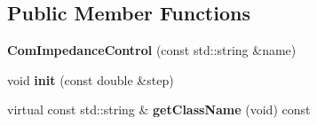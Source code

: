 \subsection*{Public Member Functions}
\begin{DoxyCompactItemize}
\item 
{\bfseries Com\+Impedance\+Control} (const std\+::string \&name)\hypertarget{classdynamicgraph_1_1sot_1_1ComImpedanceControl_a1da4aa67c57a44b99f7923053af4bda4}{}\label{classdynamicgraph_1_1sot_1_1ComImpedanceControl_a1da4aa67c57a44b99f7923053af4bda4}

\item 
void {\bfseries init} (const double \&step)\hypertarget{classdynamicgraph_1_1sot_1_1ComImpedanceControl_a6d89dd52f34e28be576e98c920e0089a}{}\label{classdynamicgraph_1_1sot_1_1ComImpedanceControl_a6d89dd52f34e28be576e98c920e0089a}

\item 
virtual const std\+::string \& {\bfseries get\+Class\+Name} (void) const \hypertarget{classdynamicgraph_1_1sot_1_1ComImpedanceControl_a9cb84783c4bc60a5e45c1e57a538e8bb}{}\label{classdynamicgraph_1_1sot_1_1ComImpedanceControl_a9cb84783c4bc60a5e45c1e57a538e8bb}

\end{DoxyCompactItemize}
